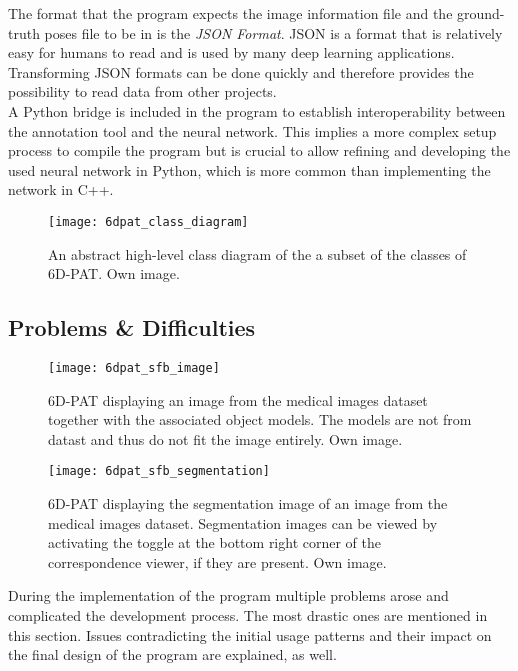 The format that the program expects the image information file and the ground-truth poses file to be in is the \textit{JSON Format}. JSON is a format that is relatively easy for humans to read and is used by many deep learning applications. Transforming JSON formats can be done quickly and therefore provides the possibility to read data from other projects. \\

A Python bridge is included in the program to establish interoperability between the annotation tool and the neural network. This implies a more complex setup process to compile the program but is crucial to allow refining and developing the used neural network in Python, which is more common than implementing the network in C++.

\begin{figure}[!tbp]
	\centering
    \texttt{[image: 6dpat\_class\_diagram]}
    \caption{An abstract high-level class diagram of the a subset of the classes of 6D-PAT. Own image.}
    \label{fig:6dpat_components}
\end{figure} 

\subsection{Problems \& Difficulties} \label{section:6dpat_difficulties}

\begin{figure}[!tbp]
	\centering
    \texttt{[image: 6dpat\_sfb\_image]}
    \caption{6D-PAT displaying an image from the medical images dataset together with the associated object models. The models are not from datast and thus do not fit the image entirely. Own image.}
    \label{fig:6dpat_sfb_image}
\end{figure} 

\begin{figure}[!tbp]
	\centering
    \texttt{[image: 6dpat\_sfb\_segmentation]}
    \caption{6D-PAT displaying the segmentation image of an image from the medical images dataset. Segmentation images can be viewed by activating the toggle at the bottom right corner of the correspondence viewer, if they are present. Own image.}
    \label{fig:6dpat_sfb_segmentation}
\end{figure} 

During the implementation of the program multiple problems arose and complicated the development process. The most drastic ones are mentioned in this section. Issues contradicting the initial usage patterns and their impact on the final design of the program are explained, as well. \\

